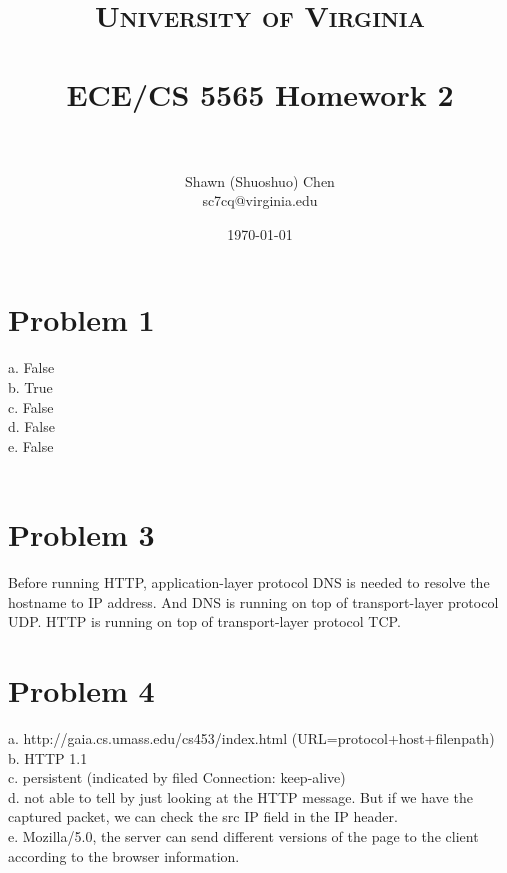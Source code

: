 \documentclass[titlepage, paper=a4, fontsize=11pt]{scrartcl} %
\title{	
\normalfont \normalsize 
\textsc{University of Virginia} \\ [25pt] %
\horrule{0.5pt} \\[0.4cm] %
\huge ECE/CS 5565 Homework 2 \\ %
\horrule{2pt} \\[0.5cm] %
}
\author{Shawn (Shuoshuo) Chen\\sc7cq@virginia.edu} %
\date{\normalsize\today} %
\numberwithin{equation}{section} %
\numberwithin{figure}{section} %
\numberwithin{table}{section} %
\begin{document}
\maketitle %


\section*{Problem 1}

a. False \\
b. True \\
c. False \\
d. False \\
e. False \\
\\



\section*{Problem 3}
Before running HTTP, application-layer protocol DNS is needed to resolve the hostname to IP address.
And DNS is running on top of transport-layer protocol UDP. HTTP is running on top of transport-layer
protocol TCP.
\\



\section*{Problem 4}
a. http://gaia.cs.umass.edu/cs453/index.html  (URL=protocol+host+filenpath) \\
b. HTTP 1.1 \\
c. persistent (indicated by filed Connection: keep-alive) \\
d. not able to tell by just looking at the HTTP message. But if we have the captured packet, we can check the src IP field in the IP header. \\
e. Mozilla/5.0, the server can send different versions of the page to the client according to the browser information. \\
\\
\end{document}
